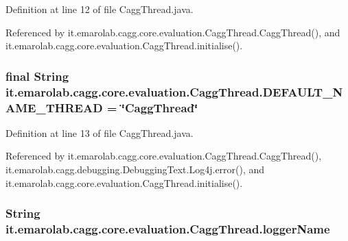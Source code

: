 Definition at line 12 of file Cagg\-Thread.\-java.



Referenced by it.\-emarolab.\-cagg.\-core.\-evaluation.\-Cagg\-Thread.\-Cagg\-Thread(), and it.\-emarolab.\-cagg.\-core.\-evaluation.\-Cagg\-Thread.\-initialise().

\hypertarget{classit_1_1emarolab_1_1cagg_1_1core_1_1evaluation_1_1CaggThread_a6cca2e13b67a575b0d66600b9659a933}{
\subsubsection[{D\-E\-F\-A\-U\-L\-T\-\_\-\-N\-A\-M\-E\-\_\-\-T\-H\-R\-E\-A\-D}]{\setlength{\rightskip}{0pt plus 5cm}final String it.\-emarolab.\-cagg.\-core.\-evaluation.\-Cagg\-Thread.\-D\-E\-F\-A\-U\-L\-T\-\_\-\-N\-A\-M\-E\-\_\-\-T\-H\-R\-E\-A\-D = \char`\"{}Cagg\-Thread\char`\"{}\hspace{0.3cm}{\ttfamily [static]}}}\label{classit_1_1emarolab_1_1cagg_1_1core_1_1evaluation_1_1CaggThread_a6cca2e13b67a575b0d66600b9659a933}


Definition at line 13 of file Cagg\-Thread.\-java.



Referenced by it.\-emarolab.\-cagg.\-core.\-evaluation.\-Cagg\-Thread.\-Cagg\-Thread(), it.\-emarolab.\-cagg.\-debugging.\-Debugging\-Text.\-Log4j.\-error(), and it.\-emarolab.\-cagg.\-core.\-evaluation.\-Cagg\-Thread.\-initialise().

\hypertarget{classit_1_1emarolab_1_1cagg_1_1core_1_1evaluation_1_1CaggThread_ae7dd4d1aec246c90d4a997b825978256}{
\subsubsection[{logger\-Name}]{\setlength{\rightskip}{0pt plus 5cm}String it.\-emarolab.\-cagg.\-core.\-evaluation.\-Cagg\-Thread.\-logger\-Name\hspace{0.3cm}{\ttfamily [private]}}}\label{classit_1_1emarolab_1_1cagg_1_1core_1_1evaluation_1_1CaggThread_ae7dd4d1aec246c90d4a997b825978256}


